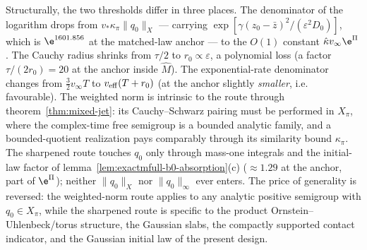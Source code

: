\begin{remark}
Structurally, the two thresholds differ in three places.  The denominator
of the logarithm drops from \(v_*\kappa_\pi\|q_0\|_X\) --- carrying
\(\exp[\gamma(z_0-\bar z)^2/(\varepsilon^2D_0)]\), which is
\(\e^{1601.856}\) at the matched-law anchor --- to the \(O(1)\) constant
\(\hat\kappa v_\infty\e^{\Pi}\).  The Cauchy radius shrinks from
\(\tau/2\) to \(r_0\propto\varepsilon\), a polynomial loss (a factor
\(\tau/(2r_0)=20\) at the anchor inside \(\hat M\)).  The exponential-rate
denominator changes from \(\tfrac32v_\infty T\) to
\(v_{\rm eff}(T+r_0)\) (at the anchor slightly \emph{smaller}, i.e.
favourable).  The weighted norm is intrinsic to the route through
theorem~\ref{thm:mixed-jet}: its Cauchy--Schwarz pairing must be performed
in \(X_\pi\), where the complex-time free semigroup is a bounded analytic
family, and a bounded-quotient realization pays comparably through its
similarity bound \(\kappa_\pi\).  The sharpened route touches \(q_0\) only
through mass-one integrals and the initial-law factor of
lemma~\ref{lem:exactmfull-b0-absorption}(c) (\(\approx1.29\) at the
anchor, part of \(\e^{\Pi}\)); neither \(\|q_0\|_X\) nor
\(\|q_0\|_\infty\) ever enters.  The price of generality is reversed: the
weighted-norm route applies to any analytic positive semigroup with
\(q_0\in X_\pi\), while the sharpened route is specific to the product
Ornstein--Uhlenbeck/torus structure, the Gaussian slabs, the compactly
supported contact indicator, and the Gaussian initial law of the present
design.
\end{remark}

